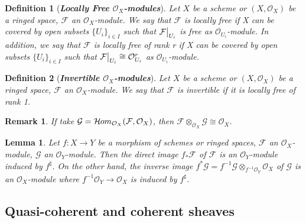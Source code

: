 \documentclass{ctexart}
\newtheorem{definition}{Definition}[section]
\newtheorem{remark}{Remark}[section]
\newtheorem{lemma}{Lemma}[section]
\newcommand{\sheafhom}{\mathcal{H}\kern -.5pt om}
\begin{document}
\begin{definition}[\textbf{\emph{Locally Free $\mathcal{O}_{X}$-modules}}]
    Let $X$ be a scheme or $(X, \mathcal{O}_{X})$ be a ringed space, $\mathcal{F}$ an $\mathcal{O}_{X}$-module.
    We say that $\mathcal{F}$ is locally free if X can be covered by open subsets $\{U_{i}\}_{i\in I}$ such that $\mathcal{F}\big{|}_{U_{i}}$ is free as $\mathcal{O}_{U_{i}}$-module.
    In addition, we say that $\mathcal{F}$ is locally free of rank r if X can be covered by open subsets $\{U_{i}\}_{i\in I}$ such that $\mathcal{F}\big{|}_{U_{i}} \cong \mathcal{O}_{U_{i}}^{r}$ as $\mathcal{O}_{U_{i}}$-module.
\end{definition}
\begin{definition}[\textbf{\emph{Invertible $\mathcal{O}_{X}$-modules}}]
    Let $X$ be a scheme or $(X, \mathcal{O}_{X})$ be a ringed space, $\mathcal{F}$ an $\mathcal{O}_{X}$-module.
    We say that $\mathcal{F}$ is invertible if it is locally free of rank 1.
\end{definition}
\begin{remark}
    If take $\mathcal{G} = \sheafhom_{\mathcal{O}_{X}}(\mathcal{F}, \mathcal{O}_{X})$, then $\mathcal{F} \otimes_{\mathcal{O}_{X}} \mathcal{G} \cong \mathcal{O}_{X}$.
\end{remark}
\begin{lemma}
    Let $f: X \longrightarrow Y$ be a morphism of schemes or ringed spaces, $\mathcal{F}$ an $\mathcal{O}_{X}$-module, $\mathcal{G}$ an $\mathcal{O}_{Y}$-module.
    Then the direct image $f_{\ast}\mathcal{F}$ of $\mathcal{F}$ is an $\mathcal{O}_{Y}$-module induced by $f^{\sharp}$.
    On the other hand, the inverse image $f^{\ast}\mathcal{G} = f^{-1}\mathcal{G} \otimes_{f^{-1}\mathcal{O}_{Y}} \mathcal{O}_{X}$ of $\mathcal{G}$ is an $\mathcal{O}_{X}$-module where $f^{-1}\mathcal{O}_{Y} \longrightarrow \mathcal{O}_{X}$ is induced by $f^{\sharp}$.
    \label{Lemma 1.1}
\end{lemma}

\subsection{Quasi-coherent and coherent sheaves}
\label{subsection:Vector_Bundles_Quasi-coherent_and_coherent_sheaves}
\end{document}
